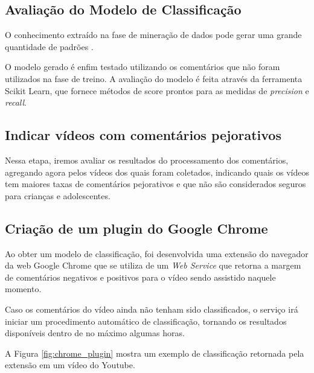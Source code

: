 \subsection{Avaliação do Modelo de Classificação}
O conhecimento extraído na fase de mineração de dados pode gerar uma grande quantidade de padrões \cite{morais2007mineraccao}.

O modelo gerado é enfim testado utilizando os comentários que não foram utilizados na fase de treino. 
A avaliação do modelo é feita através da ferramenta Scikit Learn, que fornece métodos de score prontos para as medidas de \textit{precision} e \textit{recall}. %


\subsection{Indicar vídeos com comentários pejorativos}
Nessa etapa, iremos avaliar os resultados do processamento dos comentários, agregando agora pelos vídeos dos quais foram coletados, indicando quais os vídeos tem maiores taxas de comentários pejorativos e que não são considerados seguros para crianças e adolescentes.



\subsection{Criação de um plugin do Google Chrome}

Ao obter um modelo de classificação, foi desenvolvida uma extensão do navegador da web Google Chrome que se utiliza de um \textit{Web Service} que retorna a margem de comentários negativos e positivos para o vídeo sendo assistido naquele momento. 

Caso os comentários do vídeo ainda não tenham sido classificados, o serviço irá iniciar um procedimento automático de classificação, tornando os resultados disponíveis dentro de no máximo algumas horas.

A Figura \ref{fig:chrome_plugin} mostra um exemplo de classificação retornada pela extensão em um vídeo do Youtube.

